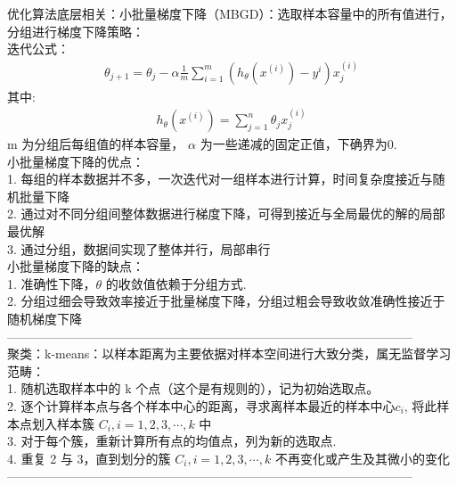 \documentclass{article}
\begin{document}
\noindent 优化算法底层相关：小批量梯度下降（MBGD）：选取样本容量中的所有值进行，分组进行梯度下降策略：\\
迭代公式：
\begin{eqnarray*}
\theta_{j+1} = \theta_{j} - \alpha\frac{1}{m}\sum_{i=1}^{m}(h_{\theta}(x^{(i)})- y^{i})x^{(i)}_{j}
\end{eqnarray*}
其中:
\begin{eqnarray*}
h_{\theta}(x^{(i)}) = \sum_{j=1}^{n}\theta_{j}x_{j}^{(i)}
\end{eqnarray*}
m 为分组后每组值的样本容量， $\alpha$ 为一些递减的固定正值，下确界为0.\\
小批量梯度下降的优点：\\
1. 每组的样本数据并不多，一次迭代对一组样本进行计算，时间复杂度接近与随机批量下降\\
2. 通过对不同分组间整体数据进行梯度下降，可得到接近与全局最优的解的局部最优解\\
3. 通过分组，数据间实现了整体并行，局部串行\\
小批量梯度下降的缺点：\\
1. 准确性下降，$\theta$ 的收敛值依赖于分组方式.\\
2. 分组过细会导致效率接近于批量梯度下降，分组过粗会导致收敛准确性接近于随机梯度下降\\
--------------------------------------------------------------------------------------------------\\

\noindent 聚类：k-means：以样本距离为主要依据对样本空间进行大致分类，属无监督学习范畴：\\
1. 随机选取样本中的 k 个点（这个是有规则的），记为初始选取点。\\
2. 逐个计算样本点与各个样本中心的距离，寻求离样本最近的样本中心$c_{i}$, 将此样本点划入样本簇 $C_{i}, i=1,2,3,\cdots, k$ 中\\
3. 对于每个簇，重新计算所有点的均值点，列为新的选取点.\\
4. 重复 2 与 3，直到划分的簇 $C_{i},  i=1,2,3,\cdots, k$ 不再变化或产生及其微小的变化\\
--------------------------------------------------------------------------------------------------\\
\end{document}
